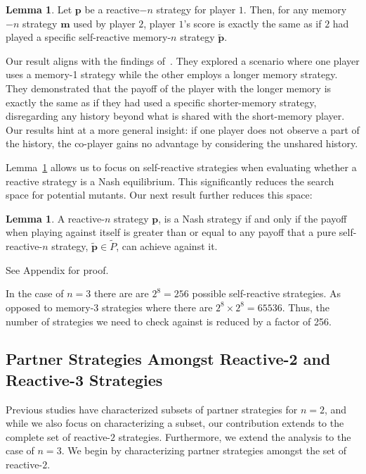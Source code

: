 \documentclass{article}
\theoremstyle{definition}
\newtheorem{lemma}[theorem]{Lemma}
\begin{document}
\begin{lemma}\label{lemma:self_reactive_sufficiency}
  Let $\mathbf{p}$ be a reactive$-n$ strategy for player $1$. Then, for any
  memory$-n$ strategy $\mathbf{m}$ used by player $2$, player $1$'s score is
  exactly the same as if $2$ had played a specific self-reactive memory-$n$
  strategy $\mathbf{\tilde{p}}$.
\end{lemma}

Our result aligns with the findings of~\citep{press:PNAS:2012}. They explored a
scenario where one player uses a memory-1 strategy while the other employs a
longer memory strategy. They demonstrated that the payoff of the player with the
longer memory is exactly the same as if they had used a specific shorter-memory
strategy, disregarding any history beyond what is shared with the short-memory
player. Our results hint at a more general insight: if one player does not
observe a part of the history, the co-player gains no advantage by considering
the unshared history.

Lemma~\ref{lemma:self_reactive_sufficiency} allows us to focus on self-reactive
strategies when evaluating whether a reactive strategy is a Nash equilibrium.
This significantly reduces the search space for potential mutants. Our next
result further reduces this space:

\begin{lemma}\label{lemma:nash_against_pure_self_reactive}
  A reactive-$n$ strategy $\mathbf{p}$, is a Nash strategy if and only if the
  payoff when playing against itself is greater than or equal to any payoff that
  a pure self-reactive-$n$ strategy, $\tilde{\mathbf{p}} \in \tilde{P}$, can
  achieve against it.
\end{lemma}

See Appendix for proof.

In the case of $n=3$ there are are $2^8 = 256$ possible self-reactive strategies.
As opposed to memory-3 strategies where there are $2^8 \times 2^8 = 65536$. Thus,
the number of strategies we need to check against is reduced by a factor of 256.

\subsection{Partner Strategies Amongst Reactive-2 and Reactive-3 Strategies}

Previous studies have characterized subsets of partner strategies for $n = 2$,
and while we also focus on characterizing a subset, our contribution extends to
the complete set of reactive-$2$ strategies. Furthermore, we extend the analysis
to the case of $n = 3$. We begin by characterizing partner strategies amongst
the set of reactive-$2$.
\end{document}
